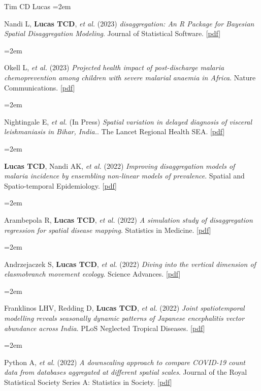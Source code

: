 \documentclass{scrartcl}
\newcommand{\MarginText}[1]{\marginpar{\raggedleft\itshape\small#1}} %
\newcommand{\Description}[1]{\hangindent=2em\hangafter=0\noindent\raggedright\footnotesize{#1}\par\normalsize\vspace{1em}} %
\begin{document}
\begin{cv}{Tim {\Large CD} Lucas}
\Description{\MarginText{2023}Nandi L, \textbf{Lucas TCD}, \emph{et al.} (2023) \emph{disaggregation: An R Package for Bayesian Spatial Disaggregation Modeling}. Journal of Statistical Software. [\href{https://www.jstatsoft.org/article/view/v106i11}{pdf}]}

\Description{Okell L, \emph{et al.} (2023) \emph{Projected health impact of post-discharge malaria chemoprevention among children with severe malarial anaemia in Africa}. Nature Communications. [\href{https://www.nature.com/articles/s41467-023-35939-w}{pdf}]}


\Description{Nightingale E, \emph{et al.} (In Press) \emph{Spatial variation in delayed diagnosis of visceral leishmaniasis in Bihar, India.}. The Lancet Regional Health SEA. [\href{https://papers.ssrn.com/sol3/papers.cfm?abstract_id=4233127}{pdf}]}



\Description{\MarginText{2022}\textbf{Lucas TCD}, Nandi AK,  \emph{et al.} (2022) \emph{ Improving disaggregation models of malaria incidence by ensembling non-linear models of prevalence}. Spatial and Spatio-temporal Epidemiology. [\href{https://reader.elsevier.com/reader/sd/pii/S1877584520300356?token=A7B0EF0114C0A057AD7F1E13B7F97FE4D359B945C1F09211AC50B77D272216014E3E9881E3FBFC7D3CA8A8DD5A78846A}{pdf}]}


\Description{Arambepola R, \textbf{Lucas TCD},  \emph{et al.} (2022) \emph{A simulation study of disaggregation regression for spatial disease mapping}. Statistics in Medicine. [\href{https://onlinelibrary.wiley.com/doi/full/10.1002/sim.9220}{pdf}]}



\Description{Andrzejaczek S, \textbf{Lucas TCD}, \emph{et al.} (2022) \emph{Diving into the vertical dimension of elasmobranch movement ecology}. Science Advances. [\href{https://www.science.org/doi/full/10.1126/sciadv.abo1754}{pdf}]}


\Description{Franklinos LHV, Redding D, \textbf{Lucas TCD},  \emph{et al.} (2022) \emph{Joint spatiotemporal modelling reveals seasonally dynamic patterns of Japanese encephalitis vector abundance across India}. PLoS Neglected Tropical Diseases. [\href{https://journals.plos.org/plosntds/article?id=10.1371/journal.pntd.0010218}{pdf}]}

\Description{Python A,  \emph{et al.} (2022) \emph{A downscaling approach to compare COVID-19 count data from databases aggregated at different spatial scales}. Journal of the Royal Statistical Society Series A: Statistics in Society. [\href{https://academic.oup.com/jrsssa/article/185/1/202/7068448}{pdf}]}





\end{cv}
\end{document}
